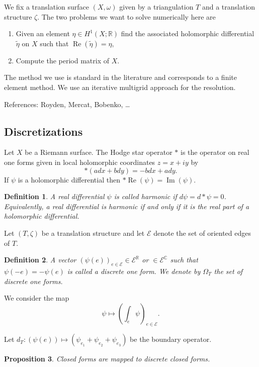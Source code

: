 \documentclass[a4paper,12pt]{article}
\def\bC{\mathbb{C}}
\def\bR{\mathbb{R}}
\def\cE{\mathcal{E}}
\def\Re{\operatorname{Re}}
\def\Im{\operatorname{Im}}
\newtheorem{definition}{Definition}
\newtheorem{proposition}[definition]{Proposition}
\begin{document}
We fix a translation surface $(X, \omega)$ given by a triangulation $T$ and a translation
structure $\zeta$. The two problems we want to solve numerically here are
\begin{enumerate}
\item Given an element $\eta \in H^1(X; \bR)$ find the associated holomorphic differential
$\tilde{\eta}$ on $X$ such that $\Re(\tilde{\eta}) = \eta$,
\item Compute the period matrix of $X$.
\end{enumerate}

The method we use is standard in the literature and corresponds to a finite element
method. We use an iterative multigrid approach for the resolution.

References: Royden, Mercat, Bobenko, \ldots

\subsection{Discretizations}
Let $X$ be a Riemann surface. The Hodge star operator $*$ is the operator on 
real one forms given in local holomorphic coordinates $z = x+iy$ by
\[
*(a dx + b dy) = -b dx + a dy.
\]
If $\psi$ is a holomorphic differential then $* \Re(\psi) = \Im(\psi)$.

\begin{definition}
A real differential $\psi$ is called \emph{harmonic} if $d \psi = d*\psi = 0$.
Equivalently, a real differential is harmonic if and only if it is the real
part of a holomorphic differential.
\end{definition}

Let $(T, \zeta)$ be a translation structure and let $\cE$ denote the set of
oriented edges of $T$. 

\begin{definition}
A vector $(\psi(e))_{e \in \cE} \in \cE^\bR$ or $\in \cE^\bC$ such that
$\psi(-e) = -\psi(e)$ is called a \emph{discrete one form}. We denote
by $\Omega_T$ the set of discrete one forms.
\end{definition}

We consider the map
\begin{equation}
\label{eq:discretization}
\psi \mapsto (\int_e \psi)_{e \in \cE}.
\end{equation}

Let $d_T: (\psi(e)) \mapsto (\psi_{e_1} + \psi_{e_2} + \psi_{e_3})$ be the boundary
operator.

\begin{proposition}
Closed forms are mapped to discrete closed forms.
\end{proposition}
\end{document}
